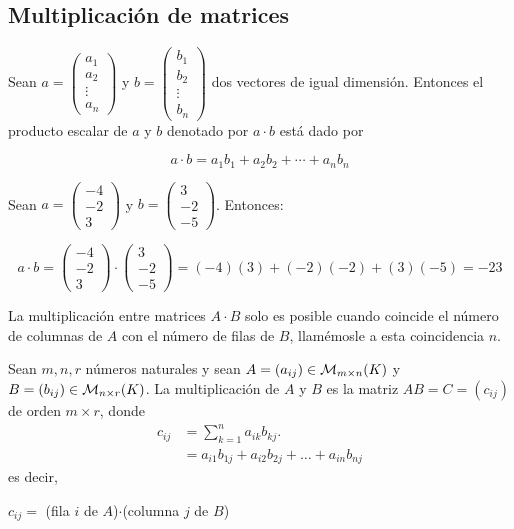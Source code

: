 \subsection{Multiplicación de matrices}


\begin{defin}
Sean $a = \begin{pmatrix} a_1 \\ a_2 \\ \vdots \\ a_n \end{pmatrix}$ y $b = \begin{pmatrix} b_1 \\ b_2 \\ \vdots \\ b_n \end{pmatrix}$ dos vectores de igual dimensión. Entonces el producto escalar de $a$ y $b$ denotado por $a \cdot b$ está dado por 

$$a \cdot b = a_1b_1 + a_2b_2 + \cdots + a_nb_n$$
\end{defin}






\begin{ejem}
Sean $a =  \begin{pmatrix} -4 \\ -2 \\ 3 \end{pmatrix}$ y $b =  \begin{pmatrix} 3 \\ -2 \\ -5 \end{pmatrix}$. Entonces:

$$a \cdot b = \begin{pmatrix} -4 \\ -2 \\ 3 \end{pmatrix} \cdot \begin{pmatrix} 3 \\ -2 \\ -5 \end{pmatrix} = (-4)(3) + (-2)(-2) + (3)(-5) = -23$$
\end{ejem}

La multiplicación entre matrices $A \cdot B$ solo es posible cuando coincide el número de columnas
de $A$ con el número de filas de $B$, llamémosle a esta coincidencia $n$.
\begin{defin}
Sean $m, n, r$ n\'umeros naturales y sean $A=(a_{ij})\in \mathcal{M}_{m\times n}(K)$ y \newline ${B=(b_{ij})\in \mathcal{M}_{n\times r}(K)}$. La multiplicaci\'on de $A$ y $B$ es la matriz $AB=C=(c_{ij})$ de orden $m\times r$, donde 
\begin{align*}
   c_{ij}&=\sum^n_{k=1}a_{ik}b_{kj}.\\
 &= a_{i1}b_{1j} + a_{i2}b_{2j} + \dots +a_{in}b_{nj} 
\end{align*}
es decir,
\begin{center}
    $c_{ij} =$ (fila $i$ de $A$)$\cdot$(columna $j$ de $B$)
\end{center}
\end{defin}


